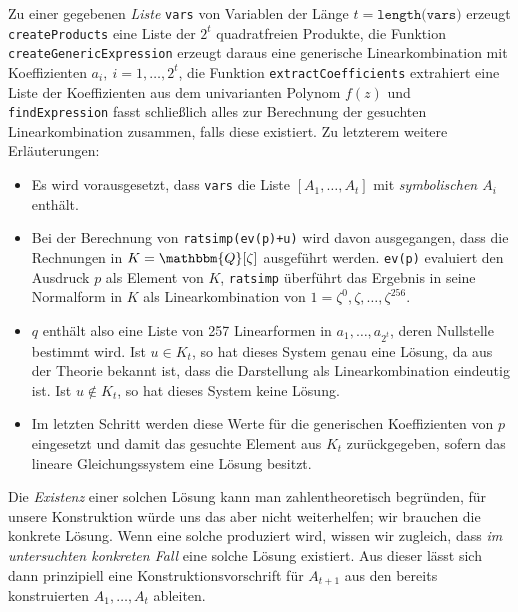 \documentclass[11pt]{article}
\newcommand{\sbr}[1]{\ensuremath{\left[#1\right]}}
\newcommand{\Q}{\mathbbm{Q}}
\begin{document}
Zu einer gegebenen \emph{Liste} \texttt{vars} von Variablen der Länge
$t=\texttt{length(vars)}$ erzeugt \texttt{create\-Products} eine Liste der
$2^t$ quadratfreien Produkte, die Funktion \texttt{createGenericExpression}
erzeugt daraus eine generische Linearkombination mit Koeffizienten
$a_i,\ i=1,\ldots,2^t$, die Funktion \texttt{extractCoefficients} extrahiert
eine Liste der Koeffizienten aus dem univarianten Polynom $f(z)$ und
\texttt{findExpression} fasst schließlich alles zur Berechnung der gesuchten
Linearkombination zusammen, falls diese existiert. Zu letzterem weitere
Erläuterungen:
\begin{itemize}
\item Es wird vorausgesetzt, dass \texttt{vars} die Liste
  $\sbr{A_1,\ldots,A_t}$ mit \emph{symbolischen $A_i$} enthält.
\item Bei der Berechnung von \texttt{ratsimp(ev(p)+u)} wird davon ausgegangen,
  dass die Rechnungen in $K=\Q[\zeta]$ ausgeführt werden. \texttt{ev(p)}
  evaluiert den Ausdruck $p$ als Element von $K$, \texttt{ratsimp} überführt
  das Ergebnis in seine Normalform in $K$ als Linearkombination von
  $1=\zeta^0, \zeta,\ldots, \zeta^{256}$.   
\item $q$ enthält also eine Liste von 257 Linearformen in
  $a_1,\ldots,a_{2^t}$, deren Nullstelle bestimmt wird. Ist $u\in K_t$, so hat
  dieses System genau eine Lösung, da aus der Theorie bekannt ist, dass die
  Darstellung als Linearkombination eindeutig ist. Ist $u\not\in K_t$, so hat
  dieses System keine Lösung.
\item Im letzten Schritt werden diese Werte für die generischen Koeffizienten
  von $p$ eingesetzt und damit das gesuchte Element aus $K_t$ zurückgegeben,
  sofern das lineare Gleichungssystem eine Lösung besitzt. 
\end{itemize}
Die \emph{Existenz} einer solchen Lösung kann man zahlentheoretisch begründen,
für unsere Konstruktion würde uns das aber nicht weiterhelfen; wir brauchen
die konkrete Lösung. Wenn eine solche produziert wird, wissen wir zugleich,
dass \emph{im untersuchten konkreten Fall} eine solche Lösung existiert.  Aus
dieser lässt sich dann prinzipiell eine Konstruktionsvorschrift für $A_{t+1}$
aus den bereits konstruierten $A_1,\ldots,A_t$ ableiten. 
\end{document}
